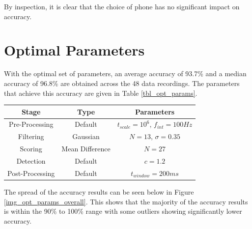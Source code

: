                 By inspection, it is clear that the choice of phone has no significant impact on accuracy.           

        \section{Optimal Parameters}

            With the optimal set of parameters, an average accuracy of 93.7\% and a median accuracy of 96.8\% are obtained across the 48 data recordings. The parameters that achieve this accuracy are given in Table \ref{tbl_opt_params}.

            \begin{center}
                \label{tbl_opt_params}
                \begin{tabular}{|c|c|c|}
                    \hline
                    Stage & Type & Parameters \\
                    \hline
                    Pre-Processing & Default & $t_{scale}=10^6$, $f_{int}=100Hz$ \\
                    Filtering & Gaussian & $N=13$, $\sigma=0.35$ \\
                    Scoring & Mean Difference & $N=27$ \\
                    Detection & Default & $c=1.2$ \\
                    Post-Processing & Default & $t_{window}=200ms$ \\
                    \hline
                \end{tabular}
            \end{center}

            The spread of the accuracy results can be seen below in Figure \ref{img_opt_params_overall}. This shows that the majority of the accuracy results is within the 90\% to 100\% range with some outliers showing significantly lower accuracy.

